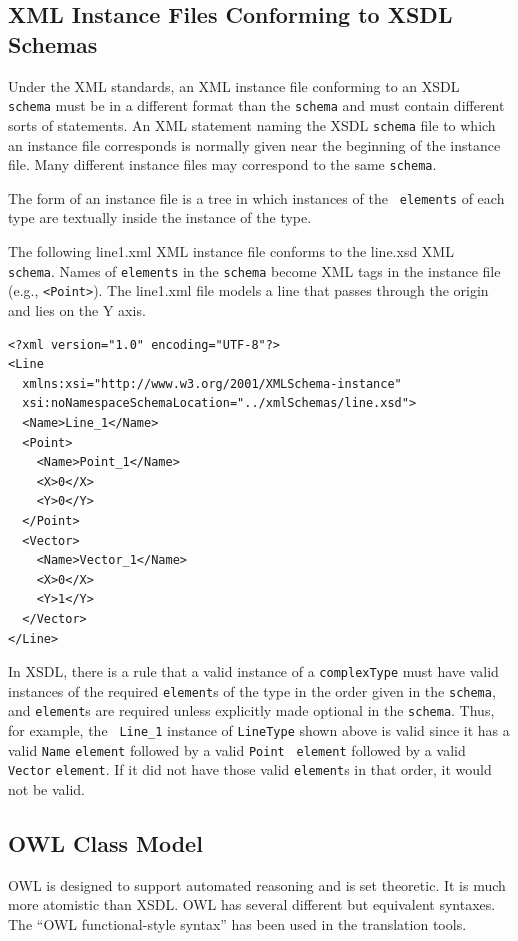 \documentclass[preprint,12pt]{elsarticle}
\begin{document}
\subsection{XML Instance Files Conforming to XSDL Schemas}
\label{xmlInstanceFiles}

Under the XML standards, an XML instance file conforming to an XSDL {\tt
  schema} must be in a different format than the {\tt schema} and must
contain different sorts of statements. An XML statement naming the XSDL
{\tt schema} file to which an instance file corresponds is normally given
near the beginning of the instance file. Many different instance files may
correspond to the same {\tt schema}.

The form of an instance file is a tree in which instances of the {\tt
  elements} of each type are textually inside the instance of the type.

The following line1.xml XML instance file conforms to the line.xsd XML {\tt
  schema}. Names of {\tt elements} in the {\tt schema} become XML tags in
the instance file (e.g., {\tt <Point>}). The line1.xml file models a line
that passes through the origin and lies on the Y axis.

\begin{verbatim}
<?xml version="1.0" encoding="UTF-8"?>
<Line
  xmlns:xsi="http://www.w3.org/2001/XMLSchema-instance"
  xsi:noNamespaceSchemaLocation="../xmlSchemas/line.xsd">
  <Name>Line_1</Name>
  <Point>
    <Name>Point_1</Name>
    <X>0</X>
    <Y>0</Y>
  </Point>
  <Vector>
    <Name>Vector_1</Name>
    <X>0</X>
    <Y>1</Y>
  </Vector>
</Line>
\end{verbatim}

In XSDL, there is a rule that a valid instance of a {\tt complexType} must
have valid instances of the required {\tt element}s of the type in the
order given in the {\tt schema}, and {\tt element}s are required unless
explicitly made optional in the {\tt schema}. Thus, for example, the {\tt
  Line\_1} instance of {\tt LineType} shown above is valid since it has a
valid {\tt Name} {\tt element} followed by a valid {\tt Point} {\tt
  element} followed by a valid {\tt Vector} {\tt element}. If it did not
have those valid {\tt element}s in that order, it would not be valid.

\subsection{OWL Class Model}
\label{owlClassModel}

OWL is designed to support automated reasoning and is set theoretic. It is
much more atomistic than XSDL. OWL has several different but equivalent
syntaxes. The “OWL functional-style syntax” has been used in the
translation tools.
\end{document}
